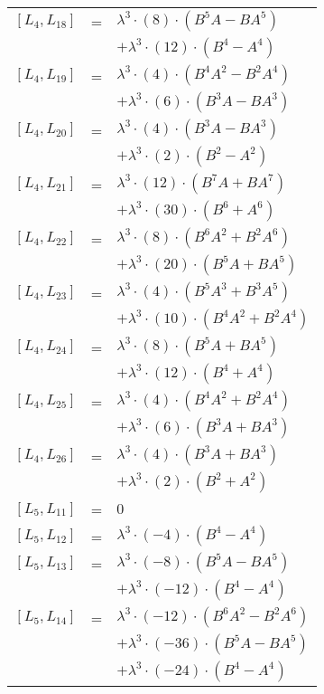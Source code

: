 \documentclass{article}
\begin{document}
\begin{center}
\begin{longtable}{lll}
$[L_{4},L_{18}]$ & = & ${\lambda}^3{\cdot}(8){\cdot}(B^{5}A-BA^{5})$ \\*
 & & $ + {\lambda}^3{\cdot}(12){\cdot}(B^{4}-A^{4})$ \\
$[L_{4},L_{19}]$ & = & ${\lambda}^3{\cdot}(4){\cdot}(B^{4}A^{2}-B^{2}A^{4})$ \\*
 & & $ + {\lambda}^3{\cdot}(6){\cdot}(B^{3}A-BA^{3})$ \\
$[L_{4},L_{20}]$ & = & ${\lambda}^3{\cdot}(4){\cdot}(B^{3}A-BA^{3})$ \\*
 & & $ + {\lambda}^3{\cdot}(2){\cdot}(B^{2}-A^{2})$ \\
$[L_{4},L_{21}]$ & = & ${\lambda}^3{\cdot}(12){\cdot}(B^{7}A+BA^{7})$ \\*
 & & $ + {\lambda}^3{\cdot}(30){\cdot}(B^{6}+A^{6})$ \\
$[L_{4},L_{22}]$ & = & ${\lambda}^3{\cdot}(8){\cdot}(B^{6}A^{2}+B^{2}A^{6})$ \\*
 & & $ + {\lambda}^3{\cdot}(20){\cdot}(B^{5}A+BA^{5})$ \\
$[L_{4},L_{23}]$ & = & ${\lambda}^3{\cdot}(4){\cdot}(B^{5}A^{3}+B^{3}A^{5})$ \\*
 & & $ + {\lambda}^3{\cdot}(10){\cdot}(B^{4}A^{2}+B^{2}A^{4})$ \\
$[L_{4},L_{24}]$ & = & ${\lambda}^3{\cdot}(8){\cdot}(B^{5}A+BA^{5})$ \\*
 & & $ + {\lambda}^3{\cdot}(12){\cdot}(B^{4}+A^{4})$ \\
$[L_{4},L_{25}]$ & = & ${\lambda}^3{\cdot}(4){\cdot}(B^{4}A^{2}+B^{2}A^{4})$ \\*
 & & $ + {\lambda}^3{\cdot}(6){\cdot}(B^{3}A+BA^{3})$ \\
$[L_{4},L_{26}]$ & = & ${\lambda}^3{\cdot}(4){\cdot}(B^{3}A+BA^{3})$ \\*
 & & $ + {\lambda}^3{\cdot}(2){\cdot}(B^{2}+A^{2})$ \\
$[L_{5},L_{11}]$ & = & $ 0 $ \\
$[L_{5},L_{12}]$ & = & ${\lambda}^3{\cdot}(-4){\cdot}(B^{4}-A^{4})$ \\
$[L_{5},L_{13}]$ & = & ${\lambda}^3{\cdot}(-8){\cdot}(B^{5}A-BA^{5})$ \\*
 & & $ + {\lambda}^3{\cdot}(-12){\cdot}(B^{4}-A^{4})$ \\
$[L_{5},L_{14}]$ & = & ${\lambda}^3{\cdot}(-12){\cdot}(B^{6}A^{2}-B^{2}A^{6})$ \\*
 & & $ + {\lambda}^3{\cdot}(-36){\cdot}(B^{5}A-BA^{5})$ \\*
 & & $ + {\lambda}^3{\cdot}(-24){\cdot}(B^{4}-A^{4})$ \\

\end{longtable}
\end{center}
\end{document}
